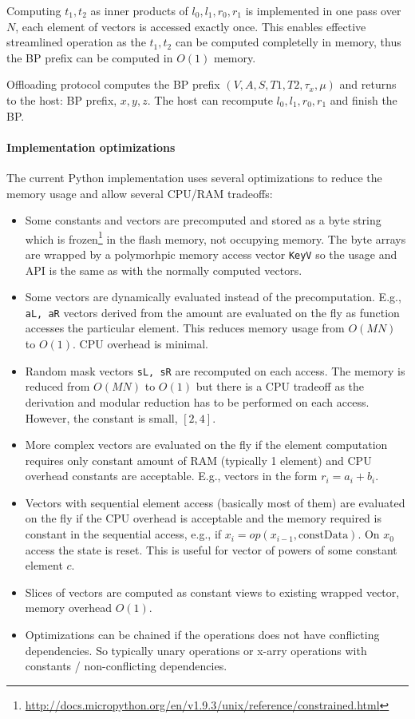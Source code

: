 \documentclass[]{article}
\begin{document}
Computing $t_1, t_2$ as inner products of $l_0, l_1, r_0, r_1$ is implemented in one pass over $N$, each element of vectors is accessed exactly once. This enables effective streamlined operation as the $t_1, t_2$ can be computed completelly in memory, thus the BP prefix can be computed in $O(1)$ memory.

Offloading protocol computes the BP prefix $(V, A, S, T1, T2, \tau_x, \mu)$ and returns to the host: BP prefix, $x, y, z$. The host can recompute $l_0, l_1, r_0, r_1$ and finish the BP.

\paragraph{Implementation optimizations}
The current Python implementation uses several optimizations to reduce the memory usage and allow several CPU/RAM tradeoffs:
\begin{itemize}
	\item Some constants and vectors are precomputed and stored as a byte string which is frozen\footnote{\url{http://docs.micropython.org/en/v1.9.3/unix/reference/constrained.html}} in the flash memory, not occupying memory. The byte arrays are wrapped by a polymorhpic memory access vector \verb|KeyV| so the usage and API is the same as with the normally computed vectors.
	
	\item Some vectors are dynamically evaluated instead of the precomputation. E.g., \verb|aL, aR| vectors derived from the amount are evaluated on the fly as function accesses the particular element. This reduces memory usage from $O(MN)$ to $O(1)$. CPU overhead is minimal.
	
	\item Random mask vectors \verb|sL, sR| are recomputed on each access. The memory is reduced from $O(MN)$ to $O(1)$ but there is a CPU tradeoff as the derivation and modular reduction has to be performed on each access. However, the constant is small, $[2,4]$.
	
	\item More complex vectors are evaluated on the fly if the element computation requires only constant amount  of RAM (typically 1 element) and CPU overhead constants are acceptable. E.g., vectors in the form $r_i=a_i+b_i$. 
	
	\item Vectors with sequential element access (basically most of them) are evaluated on the fly if the CPU overhead is acceptable and the memory required is constant in the sequential access, e.g., if $x_i = op(x_{i-1}, \text{constData})$. On $x_0$ access the state is reset. This is useful for vector of powers of some constant element $c$.
	
	\item Slices of vectors are computed as constant views to existing wrapped vector, memory overhead $O(1)$.
	
	\item Optimizations can be chained if the operations does not have conflicting dependencies. So typically unary operations or x-arry operations with constants / non-conflicting dependencies.
	
\end{itemize}
\end{document}
